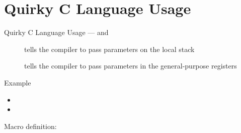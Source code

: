 \section{Quirky C Language Usage}
\label{sec:quirky-c-language}

\begin{frame}{Quirky C Language Usage}{ ---  and }
  \begin{description}
  \item[] tells the compiler to pass parameters on the local stack
  \item[] tells the compiler to pass parameters in the general-purpose
    registers
  \end{description}
  \begin{block}{Example}
    \begin{itemize}
    \item {}
    \item {}
    \end{itemize}
  \end{block}

  Macro definition:
  
  \mbox{{\small{}}}

  \mbox{\small{}}
\end{frame}

